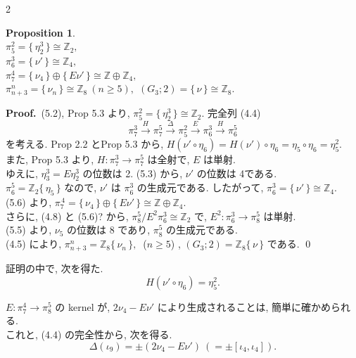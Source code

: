 \documentclass[10pt, leqno]{ltjsarticle}
\newcommand{\gen}[1]{\{\,#1\,\}}       %
\numberwithin{equation}{section}
\theoremstyle{plain}
\newtheorem{proposition}[theorem]{Proposition}
\theoremstyle{definition}
\theoremstyle{remark}
\begin{document}
\begin{paracol}{2}

\begin{proposition}\label{prop:5.6}
\ \\
\(\pi^{2}_{5}=\gen{\eta_{2}^{3}}\cong \mathbb Z_{2},\) \\
\(\pi^{3}_{6}=\gen{\nu'}\cong \mathbb Z_{4},\) \\
\(\pi^{4}_{7}=\gen{\nu_{4}}\oplus \gen{E\nu'}\cong \mathbb Z\oplus\mathbb Z_{4},\) \\
\(\pi^{n}_{n+3}=\gen{\nu_{n}}\cong \mathbb Z_{8}\ (n\ge5),\)\qquad
\((G_{3};2)=\gen{\nu}\cong \mathbb Z_{8}.\)
\end{proposition}

\noindent
\textbf{Proof.}\ 
(5.2), Prop 5.3 より,
\(\pi^{2}_{5}=\gen{\eta_{2}^{3}}\cong\mathbb Z_{2}\). 
完全列 (4.4)
\[
\pi^{3}_{7}\xrightarrow{H}\pi^{5}_{7}\xrightarrow{\Delta}\pi^{2}_{5}
\xrightarrow{E}\pi^{3}_{6}\xrightarrow{H}\pi^{5}_{6}
\]
を考える. Prop 2.2 とProp 5.3 から,
\(
H(\nu'\circ \eta_{6})=H(\nu')\circ\eta_{6}
=\eta_{5}\circ \eta_{6}=\eta^{2}_{5}.
\)\\
また, Prop 5.3 より,
\(H:\pi_{7}^{3}\to \pi_{7}^{5}\) は全射で, 
\(E\) は単射. \\
ゆえに, \(\eta^{3}_{3}=E\eta^{3}_{2}\) の位数は 2. 
(5.3) から, \(\nu'\) の位数は 4である. \\
\(\pi_6^5=\mathbb Z_2\gen{\eta_5}\) なので, 
\(\nu'\) は \(\pi_6^3\) の生成元である. 
したがって, \(\pi^{3}_{6}=\gen{\nu'}\cong\mathbb Z_{4}\). \\
(5.6) より, \(\pi^{\,4}_{7}=\gen{\nu_{4}}\oplus \gen{E\nu'}
\cong \mathbb Z\oplus\mathbb Z_{4}\). \\
さらに, (4.8) と (5.6)? から, 
\(\pi^{5}_{8}/E^{2}\pi^{3}_{6}\cong \mathbb Z_{2}\) で, 
\(E^{2}:\pi^{3}_{6}\to \pi^{5}_{8}\) は単射. \\
(5.5) より,
\(\nu_5\) の位数は 8 であり, \(\pi_8^5\) の生成元である. \\
(4.5) により, 
\(\pi_{n+3}^n=\mathbb Z_8\gen{\nu_n},\ \) (\(n\ge5\)) , 
\((G_3;2)=\mathbb Z_8\gen{\nu}\) である. 
\qed

証明の中で, 次を得た. 
\begin{equation}\label{eq:5.7}
H(\nu'\circ\eta_6)=\eta_5^2 .
\end{equation}

\(E:\pi_7^4\rightarrow\pi_8^5\) の kernel が,
\(2\nu_4-E\nu'\) により生成されることは, 簡単に確かめられる. \\
これと, (4.4) の完全性から, 次を得る. 
\begin{equation}\label{eq:5.8}
\Delta(\iota_9)=\pm(2\nu_4-E\nu')  \ (=\pm[\iota_4, \iota_4]) .
\end{equation}


\end{paracol}
\end{document}
